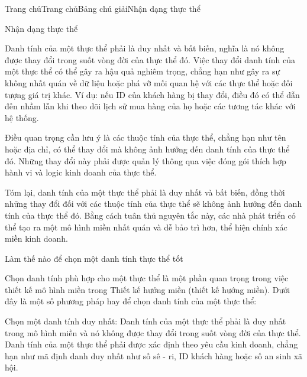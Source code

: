 




Trang chủTrang chủBảng chú giảiNhận dạng thực thể

Nhận dạng thực thể

Danh tính của một thực thể phải là duy nhất và bất biến, nghĩa là nó không được thay đổi trong suốt vòng đời của thực thể đó. Việc thay đổi danh tính của một thực thể có thể gây ra hậu quả nghiêm trọng, chẳng hạn như gây ra sự không nhất quán về dữ liệu hoặc phá vỡ mối quan hệ với các thực thể hoặc đối tượng giá trị khác. Ví dụ: nếu ID của khách hàng bị thay đổi, điều đó có thể dẫn đến nhầm lẫn khi theo dõi lịch sử mua hàng của họ hoặc các tương tác khác với hệ thống.

Điều quan trọng cần lưu ý là các thuộc tính của thực thể, chẳng hạn như tên hoặc địa chỉ, có thể thay đổi mà không ảnh hưởng đến danh tính của thực thể đó. Những thay đổi này phải được quản lý thông qua việc đóng gói thích hợp hành vi và logic kinh doanh của thực thể.

Tóm lại, danh tính của một thực thể phải là duy nhất và bất biến, đồng thời những thay đổi đối với các thuộc tính của thực thể sẽ không ảnh hưởng đến danh tính của thực thể đó. Bằng cách tuân thủ nguyên tắc này, các nhà phát triển có thể tạo ra một mô hình miền nhất quán và dễ bảo trì hơn, thể hiện chính xác miền kinh doanh.

Làm thế nào để chọn một danh tính thực thể tốt

Chọn danh tính phù hợp cho một thực thể là một phần quan trọng trong việc thiết kế mô hình miền trong Thiết kế hướng miền (thiết kế hướng miền). Dưới đây là một số phương pháp hay để chọn danh tính của một thực thể:

Chọn một danh tính duy nhất: Danh tính của một thực thể phải là duy nhất trong mô hình miền và nó không được thay đổi trong suốt vòng đời của thực thể. Danh tính của một thực thể phải được xác định theo yêu cầu kinh doanh, chẳng hạn như mã định danh duy nhất như số sê - ri, ID khách hàng hoặc số an sinh xã hội.


